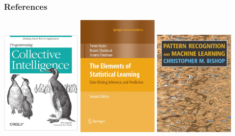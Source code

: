 \documentclass[xcolor=dvipsnames, 9pt]{beamer}
\begin{document}
\begin{frame}
  \frametitle{References}

    \begin{center}
      \includegraphics[width=0.3\textwidth]{seagaran.png}
      \includegraphics[width=0.3\textwidth]{hastie.jpg}
      \includegraphics[width=0.3\textwidth]{bishop.jpg}
    \end{center}
\end{frame}


\end{document}
